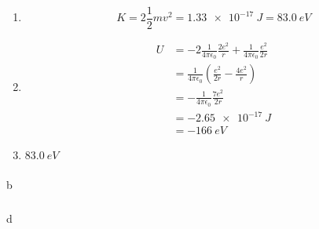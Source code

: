 \documentclass{article}
\begin{document}
\begin{enumerate}
  \item \[K = 2 \frac{1}{2} m v^2 = \qty{1.33e-17}{J} = \qty{83.0}{eV}\]

  \item

        \begin{align*}
          U & = -2 \frac{1}{4 \pi \epsilon_0} \frac{2 e^2}{r} + \frac{1}{4 \pi \epsilon_0} \frac{e^2}{2 r} \\
            & = \frac{1}{4 \pi \epsilon_0} \left( \frac{e^2}{2 r} - \frac{4 e^2}{r} \right)                \\
            & = -\frac{1}{4 \pi \epsilon_0} \frac{7 e^2}{2 r}                                              \\
            & = \qty{-2.65e-17}{J}                                                                         \\
            & = \qty{-166}{eV}
        \end{align*}

  \item $\qty{83.0}{eV}$
\end{enumerate}

\setcounter{subsubsection}{70}
\subsubsection{}

b

\setcounter{subsubsection}{72}
\subsubsection{}

d
\end{document}
